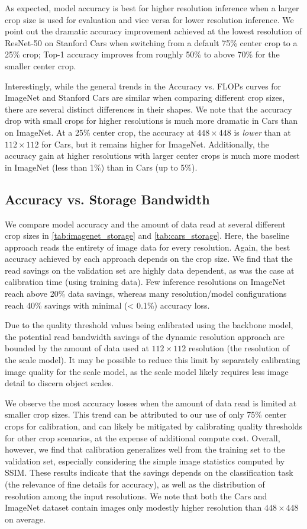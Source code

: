 As expected, model accuracy is best for higher resolution inference when a larger crop size is used for evaluation and vice versa for lower resolution inference.
We point out the dramatic accuracy improvement achieved at the lowest resolution of ResNet-50 on Stanford Cars when switching from a default 75\% center crop to a 25\% crop; Top-1 accuracy improves from roughly 50\% to above 70\% for the smaller center crop.

Interestingly, while the general trends in the Accuracy vs. FLOPs curves for ImageNet and Stanford Cars are similar when comparing different crop sizes, there are several distinct differences in their shapes.
We note that the accuracy drop with small crops for higher resolutions is much more dramatic in Cars than on ImageNet.
At a 25\% center crop, the accuracy at $448\times448$ is \emph{lower} than at $112\times112$ for Cars, but it remains higher for ImageNet. 
Additionally, the accuracy gain at higher resolutions with larger center crops is much more modest in ImageNet (less than 1\%) than in Cars (up to 5\%).


\subsection{Accuracy vs. Storage Bandwidth}
\label{sec:storage}
We compare model accuracy and the amount of data read at several different crop sizes in \autoref{tab:imagenet_storage} and \autoref{tab:cars_storage}.
Here, the baseline approach reads the entirety of image data for every resolution.
Again, the best accuracy achieved by each approach depends on the crop size.
We find that the read savings on the validation set are highly data dependent, as was the case at calibration time (using training data).
Few inference resolutions on ImageNet reach above 20\% data savings, whereas many resolution/model configurations reach 40\% savings with minimal (< 0.1\%) accuracy loss.

Due to the quality threshold values being calibrated using the backbone model, the potential read bandwidth savings of the dynamic resolution approach are bounded by the amount of data used at $112\times112$ resolution (the resolution of the scale model).
It may be possible to reduce this limit by separately calibrating image quality for the scale model, as the scale model likely requires less image detail to discern object scales.

We observe the most accuracy losses when the amount of data read is limited at smaller crop sizes.
This trend can be attributed to our use of only 75\% center crops for calibration, and can likely be mitigated by calibrating quality thresholds for other crop scenarios, at the expense of additional compute cost.
Overall, however, we find that calibration generalizes well from the training set to the validation set, especially considering the simple image statistics computed by SSIM.
These results indicate that the savings depends on the classification task (the relevance of fine details for accuracy), as well as the distribution of resolution among the input resolutions.
We note that both the Cars and ImageNet dataset contain images only modestly higher resolution than $448\times448$ on average.

